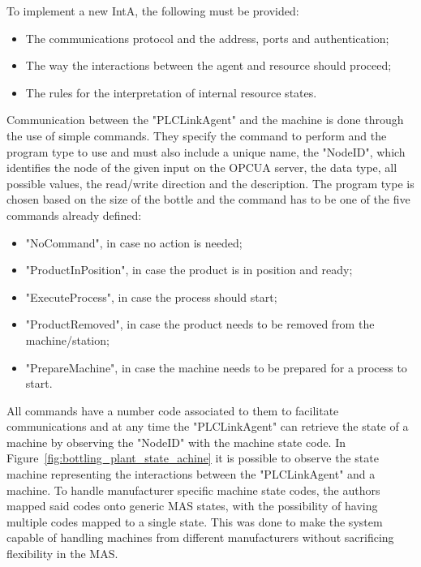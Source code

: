 To implement a new \acrshort{IntA}, the following must be provided:
\begin{itemize}
	\item The communications protocol and the address, ports and authentication;
	\item The way the interactions between the agent and resource should proceed;
	\item The rules for the interpretation of internal resource states.
\end{itemize}

Communication between the "PLCLinkAgent" and the machine is done through the use of simple commands. They specify the command to perform and the program type to use and must also include a unique name, the "NodeID", which identifies the node of the given input on the \acrshort{OPCUA} server, the data type, all possible values, the read/write direction and the description. The program type is chosen based on the size of the bottle and the command has to be one of the five commands already defined:

\begin{itemize}
	\item "NoCommand", in case no action is needed;
	\item "ProductInPosition", in case the product is in position and ready;
	\item "ExecuteProcess", in case the process should start;
	\item "ProductRemoved", in case the product needs to be removed from the machine/station;
	\item "PrepareMachine", in case the machine needs to be prepared for a process to start.
\end{itemize}

All commands have a number code associated to them to facilitate communications and at any time the "PLCLinkAgent" can retrieve the state of a machine by observing the "NodeID" with the machine state code. In Figure~\ref{fig:bottling_plant_state_achine} it is possible to observe the state machine representing the interactions between the "PLCLinkAgent" and a machine. To handle manufacturer specific machine state codes, the authors mapped said codes onto generic \acrshort{MAS} states, with the possibility of having multiple codes mapped to a single state. This was done to make the system capable of handling machines from different manufacturers without sacrificing flexibility in the \acrshort{MAS}.\\

